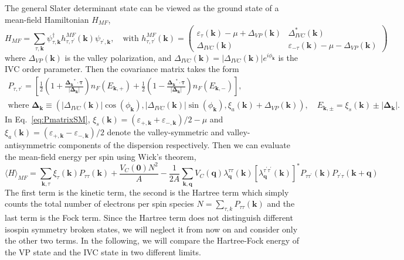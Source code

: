 \documentclass[aps,pra,twocolumn,superscriptaddress,10pt,article,nofootinbib,showpacs,longbibliography]{revtex4-1}
\def \k{{\mathbf k}}
\begin{document}
The general Slater determinant state can be viewed as the ground state of a mean-field Hamiltonian $H_{MF}$,
\begin{equation} \label{eq:MF}
    H_{MF}=\sum_{\tau, \boldsymbol{k}} \psi_{\tau, \boldsymbol{k}}^{\dagger} h_{\tau, \tau^{\prime}}^{M F}(\boldsymbol{k}) \psi_{\tau^{\prime}, \boldsymbol{k}}, \quad \text{with } h_{\tau, \tau^{\prime}}^{M F}(\boldsymbol{k})=\left(\begin{array}{cc}\varepsilon_{\tau}(\boldsymbol{k})-\mu+\Delta_{V P}(\k) & \Delta_{I V C}^{*}(\boldsymbol{k}) \\ \Delta_{I V C}(\boldsymbol{k}) & \varepsilon_{-\tau}(\boldsymbol{k})-\mu-\Delta_{V P}(\k)\end{array}\right)
\end{equation}
where $\Delta_{VP}(\k)$ is the valley polarization, and $\Delta_{IVC}(\k) = |\Delta_{IVC}(\k)|e^{i \phi_\k}$ is the IVC order parameter. 
Then the covariance matrix takes the form
\begin{gather}
    P_{\tau,\tau^\prime} = \left[ \frac{1}{2}\left( 1 + \frac{\bm{\Delta_\k}^* \cdot \bm{\tau}}{|\bm{\Delta_\k|}} \right) n_F(E_{\k,+}) + \frac{1}{2}\left( 1 - \frac{\bm{\Delta_\k}^* \cdot \bm{\tau}}{|\bm{\Delta_\k|}} \right) n_F(E_{\k,-}) \right], \nonumber\\
    \text{where }
    \bm{\Delta_\k} \equiv \left( |\Delta_{IVC}(\k)| \cos(\phi_\k), |\Delta_{IVC}(\k)| \sin(\phi_\k),  \xi_a (\k) + \Delta_{V P}(\k) \right), \quad E_{\k, \pm} = \xi_s(\k) \pm |\bm{\Delta_\k}|.
\label{eq:PmatrixSM}
\end{gather}
In Eq.~\eqref{eq:PmatrixSM}, $\xi_s(\k) = (\varepsilon_{+,\k} + \varepsilon_{-,\k})/2 - \mu $ and $\xi_a (\k) = (\varepsilon_{+,\k} - \varepsilon_{-,\k})/2$ denote the valley-symmetric and valley-antisymmetric components of the dispersion respectively. 
Then we can evaluate the mean-field energy per spin using Wick's theorem,
\begin{equation}
    \langle H\rangle_{MF} =\sum_{\boldsymbol{k}, \tau} \xi_{\tau}(\boldsymbol{k}) P_{\tau \tau}(\boldsymbol{k})+\frac{V_C(\mathbf{0}) N^{2}}{A}-\frac{1}{2A} \sum_{\k, \boldsymbol{q}} V_C(\boldsymbol{q})\lambda^{\tau \tau}_{ \boldsymbol{q}}(\boldsymbol{k}) [\lambda^{\tau^{\prime} \tau^{\prime}}_{ \boldsymbol{q}}(\boldsymbol{k}) ]^{*}P_{\tau \tau^{\prime}}(\boldsymbol{k}) P_{\tau^{\prime} \tau}(\boldsymbol{k}+\boldsymbol{q})
\end{equation}
The first term is the kinetic term, the second is the Hartree term which simply counts the total number of electrons per spin species $N=\sum_{\tau, k} P_{\tau \tau}(\boldsymbol{k})$ and the last term is the Fock term. Since the Hartree term does not distinguish different isospin symmetry broken states, we will neglect it from now on and consider only the other two
terms. In the following, we will compare the Hartree-Fock energy of the VP state and the IVC state in two different limits.
\end{document}
